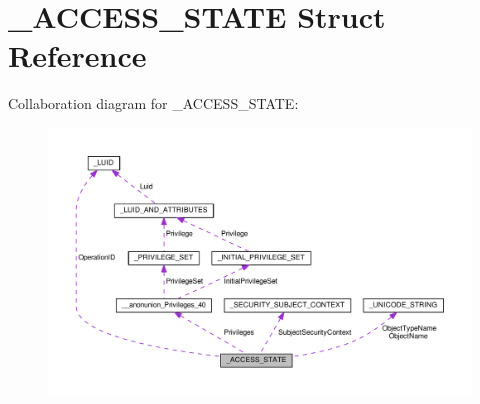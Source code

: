 \hypertarget{struct__ACCESS__STATE}{}\section{\+\_\+\+A\+C\+C\+E\+S\+S\+\_\+\+S\+T\+A\+T\+E Struct Reference}
\label{struct__ACCESS__STATE}


Collaboration diagram for \+\_\+\+A\+C\+C\+E\+S\+S\+\_\+\+S\+T\+A\+T\+E\+:
\nopagebreak
\begin{figure}[H]
\begin{center}
\leavevmode
\includegraphics[width=350pt]{struct__ACCESS__STATE__coll__graph}
\end{center}
\end{figure}
